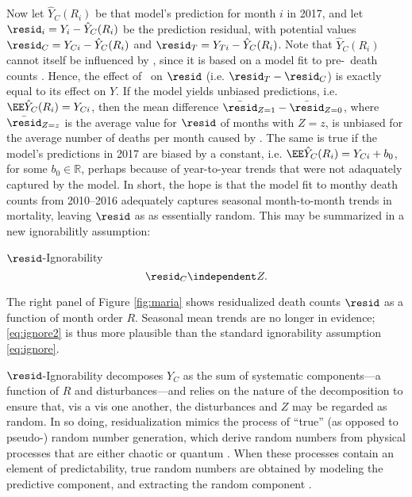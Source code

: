 Now let $\hat{Y}_C(R_i)$ be that model's prediction for month $i$ in
2017, and let $\resid_i=Y_i-\hat{Y}_C(R_i)$ be the prediction residual,
with potential values $\resid_C=Y_{Ci}-\hat{Y}_C(R_i)$ and $\resid_T=Y_{Ti}-\hat{Y}_C(R_i)$.
Note that $\hat{Y}_C(R_i)$ cannot itself be influenced by \maria,
since it is based on a model fit to pre-\maria\ death counts \citep[c.f.][]{rebarPaper}.
Hence, the effect of \maria\ on $\resid$ (i.e. $\resid_T-\resid_C$) is exactly equal to its effect on $Y$.
If the model yields unbiased predictions, i.e. $\EE
\hat{Y}_C(R_i)=Y_{Ci}$, then the mean difference
$\bar{\resid}_{Z=1}-\bar{\resid}_{Z=0}$, where $\bar{\resid}_{Z=z}$ is the average
value for $\resid$ of months with $Z=z$, is unbiased for the average number
of deaths per month caused by \maria.
The same is true if the model's predictions in 2017 are biased by a constant,
i.e. $\EE \hat{Y}_C(R_i)=Y_{Ci}+b_0$, for some $b_0\in\mathbb{R}$,
perhaps because of year-to-year trends that were not adaquately
captured by the model.
In short, the hope is that the model fit to monthy death counts from
2010--2016 adequately captures seasonal month-to-month trends in
mortality, leaving $\resid$ as as essentially random.
This may be summarized in a new ignorabilitly assumption:
\begin{ass}{$\resid$-Ignorability}
\begin{equation}\label{eq:ignore2}
\resid_{C} \independent Z.
\end{equation}
\end{ass}
The right panel of Figure \ref{fig:maria} shows residualized death counts $\resid$ as a
function of month order $R$.
Seasonal mean trends are no longer in evidence; \eqref{eq:ignore2} is
thus more plausible than the standard ignorability assumption \eqref{eq:ignore}.

$\resid$-Ignorability decomposes $Y_C$ as the sum of systematic
components---a function of $R$ and disturbances---and relies on the
nature of the decomposition to ensure
that, vis a vis one another, the disturbances and $Z$ may
be regarded as random.
In so doing, residualization mimics the process of ``true'' (as
opposed to pseudo-) random number generation, which derive random
numbers from physical processes that are either chaotic
\citep[e.g.][]{uchida2008fast} or quantum
\citep[e.g.][]{stefanov2000optical}.
When these processes contain an element
of predictability, %
true random numbers are obtained by modeling the predictive component,
and extracting the random component \citep[see, e.g.][]{Nisan1999148}.

